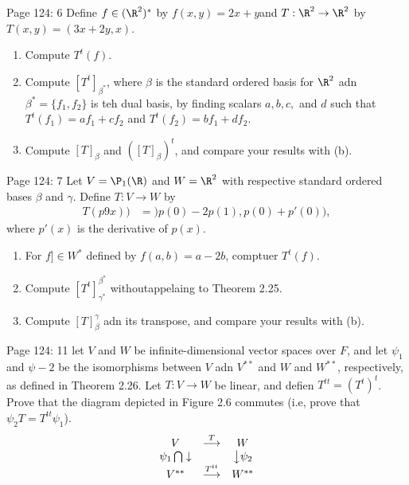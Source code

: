 \documentclass[10pt,a4paper]{report}
\begin{document}
Page 124: 6 Define $f \in (\R^2)^*$ by $f(x,y)=2x+y$and $T: \R^2\to \R^2$ by $T(x,y) = (3x+2y,x)$.
\begin{enumerate}[label=(\alph*)]
\item Compute $T^t(f)$.
\item Compute $[T^t]_{\beta^*}$, where $\beta$ is the standard ordered basis for $\R^2$ adn $\beta^*=\{f_1,f_2\}$ is teh dual basis, by finding scalars $a,b,c,$ and $d$ such that $T^t(f_1)=af_1+cf_2$ and $T^t(f_2)=bf_1+df_2$.
\item Compute $[T]_\beta$ and $([T]_\beta)^t$, and compare your results with (b).
\end{enumerate} 

Page 124: 7 Let $V=\P_1(\R)$ and $W=\R^2$ with respective standard ordered bases $\beta$ and $\gamma$.  Define $T:V\to W$ by
\begin{align*}
	T(p9x))&= )p(0)-2p(1),p(0)+p'(0)),
\end{align*}where $p'(x)$ is the derivative of $p(x)$.
\begin{enumerate}
	\item For $f ]\in W^*$ defined by $f(a,b)=a-2b$, comptuer $T^t(f)$.
	\item Compute $[T^t]_{\gamma^*}^{\beta^*}$ withoutappelaing to Theorem 2.25.
	\item Compute $[T]_\beta^\gamma$ adn its transpose, and compare your results with (b).
	
\end{enumerate}

Page 124: 11 let $V$ and $W$ be infinite-dimensional vector spaces over $F$, and let $\psi_1$ and $\psi-2$ be the isomorphisms between $V$ adn $V^{**}$ and $W$ and $W^{**}$, respectively, as defined in Theorem 2.26.  Let $T: V \to W$ be linear, and defien $T^{tt}=(T^t)^t$.  Prove that the diagram depicted in Figure 2.6 commutes (i.e, prove that $\psi_2 T = T^{tt}\psi_1$).
\begin{align*}
	\begin{array}{ccc}
		V & \overset{T} \longrightarrow & W \\
		\psi_1 \bigcap\downarrow & & \big\downarrow \psi_2 \\
		V^{**} & \overset{T^{tt}} \longrightarrow  & W^{**}
	\end{array}
\end{align*}
\end{document}
